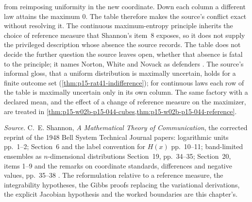 from reimposing uniformity in the new coordinate. Down each column a
different law attains the maximum \(0\). The table therefore makes the
source's conflict exact without resolving it. The continuous maximum-entropy
principle inherits the choice of reference measure that Shannon's item~8
exposes, so it does not supply the privileged description whose absence the
source records. The table does not decide the further question the source
leaves open, whether that absence is fatal to the principle; it names
Norton, White and Novack as defenders \cite[p.~244]{HajekStaffel2021Dynamics}.
The source's informal gloss, that a uniform distribution is maximally
uncertain, holds for a finite outcome set
(\cref{thm:p15-rat41-indifference}); for continuous laws each row of the
table is maximally uncertain only in its own column. The same factory with a
declared mean, and the effect of a change of reference measure on the
maximizer, are treated in \cref{thm:p15-w02b-p15-044-cubes,thm:p15-w02b-p15-044-reference}.

\emph{Source.} C.~E. Shannon, \emph{A Mathematical Theory of Communication},
the corrected reprint of the 1948 Bell System Technical Journal papers:
logarithmic units pp.~1--2; Section~6 and the label convention for \(H(x)\)
pp.~10--11; band-limited ensembles as \(n\)-dimensional distributions
Section~19, pp.~34--35; Section~20, items 1--9 and the remarks on coordinate
standards, differences and negative values, pp.~35--38
\cite{Shannon1948MathematicalTheory}. The reformulation relative to a reference
measure, the integrability hypotheses, the Gibbs proofs replacing the
variational derivations, the explicit Jacobian hypothesis and the worked
boundaries are this chapter's.
